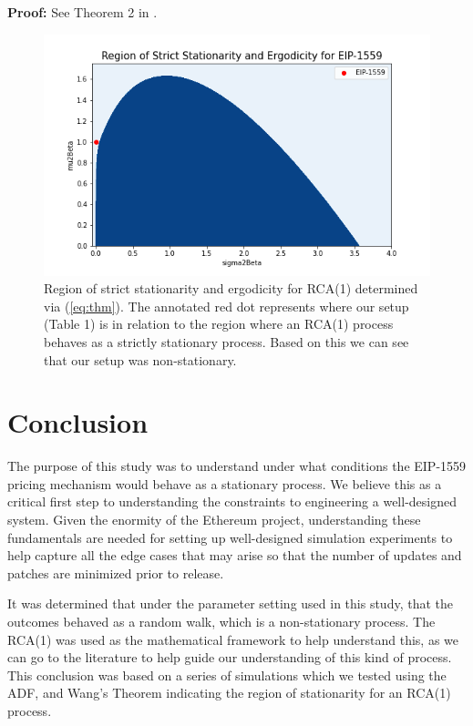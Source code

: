 \documentclass{article}
\begin{document}
\textbf{Proof:} See Theorem 2 in \cite{Wan03}.

\begin{figure}
\centering
\includegraphics[width=5in]{strict_stationarity.png}
\caption{Region of strict stationarity and ergodicity for RCA(1) determined via (\ref{eq:thm}). The annotated red dot represents where our setup (Table 1) is in relation to the region where an RCA(1) process behaves as a strictly stationary process. Based on this we can see that our setup was non-stationary.} 
\label{fig:strict_stationarity}
\end{figure} 

\section{Conclusion}
\label{section:conclusion}

The purpose of this study was to understand under what conditions the EIP-1559 pricing mechanism would behave as a stationary process. We believe this as a critical first step to understanding the constraints to engineering a well-designed system. Given the enormity of the Ethereum project, understanding these fundamentals are needed for setting up well-designed simulation experiments to help capture all the edge cases that may arise so that the number of updates and patches are minimized prior to release.

It was determined that under the parameter setting used in this study, that the outcomes behaved as a random walk, which is a non-stationary process. The RCA(1) was used as the mathematical framework to help understand this, as we can go to the literature to help guide our understanding of this kind of process. This conclusion was based on a series of simulations which we tested using the ADF, and Wang's Theorem indicating the region of stationarity for an RCA(1) process. 
\end{document}
